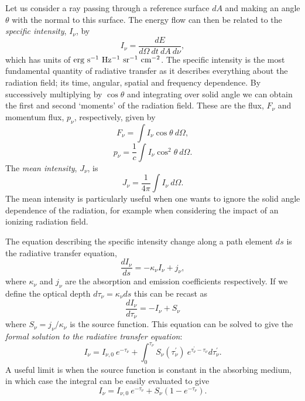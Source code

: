 Let us consider a ray passing through a reference surface $dA$ and 
making an angle $\theta$ with the normal to this surface. The energy
flow can then be related to the
{\em specific intensity}, $I_\nu$, by
\begin{equation}
I_\nu = \frac{dE}{d\Omega~dt~dA~d\nu},
\end{equation}
which has units of ${\rm erg~s^{-1}~Hz^{-1}~sr^{-1}~cm^{-2}}$. The specific
intensity is the most fundamental quantity of radiative transfer as it describes 
everything about the radiation field; its time, angular, spatial and frequency
dependence.
By successively multiplying by $\cos \theta$ and integrating over solid angle we 
can obtain the first and second `moments' of the radiation field. These
are the flux, $F_\nu$ and momentum flux, $p_\nu$, respectively, given by
\begin{equation}
F_\nu = \int I_\nu \cos \theta~d \Omega,
\end{equation}
\begin{equation}
p_\nu = \frac{1}{c} \int I_\nu \cos^2 \theta~d \Omega.
\end{equation}
The {\em mean intensity}, $J_\nu$, is
\begin{equation}
J_\nu = \frac{1}{4 \pi} \int I_\nu~d \Omega.
\end{equation}
The mean intensity is particularly
useful when one wants to ignore the solid angle dependence of the radiation,
for example when considering the impact of an ionizing radiation field.

The equation describing the specific intensity change along a path element $ds$
is the radiative transfer equation, 
\begin{equation}
\frac{d I_\nu}{ds} = -\kappa_\nu I_\nu + j_\nu, 
\label{eq:rte}
\end{equation}
where $\kappa_\nu$ and $j_\nu$ are the absorption and emission coefficients respectively.
If we define the optical depth $d \tau_\nu = \kappa_\nu ds$ this can be recast as
\begin{equation}
\frac{d I_\nu}{d \tau_\nu} = -I_\nu + S_\nu
\label{eq:formal_rte}
\end{equation}
where $S_\nu=j_\nu/\kappa_\nu$ is the source function. This equation
can be solved to give the {\em formal solution to the radiative transfer equation}:
\begin{equation}
I_\nu = I_{\nu,0}~e^{-\tau_\nu} + \int^{\tau_\nu}_0 S_\nu (\tau^\prime_\nu)~e^{\tau^\prime_\nu-\tau_\nu} d \tau^\prime_\nu.
\label{eq:rte_solution}
\end{equation}
A useful limit is when the source function is constant in the absorbing medium, in which case
the integral can be easily evaluated to give
\begin{equation}
I_\nu = I_{\nu,0}~e^{-\tau_\nu} + S_\nu (1 - e^{-\tau_\nu}).
\label{eq:rte_solution}
\end{equation}


